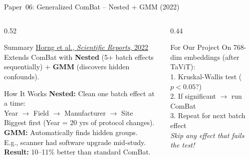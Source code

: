 \documentclass[aspectratio=169,xcolor=dvipsnames]{beamer}
\begin{document}
\begin{frame}{Paper~06: Generalized ComBat -- Nested + GMM (2022)}
    \begin{columns}
        \begin{column}{0.52\textwidth}
            \begin{block}{Summary}
                \small
                \href{https://doi.org/10.1038/s41598-022-08412-9}{Horng et al., \textit{Scientific Reports}, 2022}\\[0.3em]
                Extends ComBat with \textbf{Nested} (5+ batch effects sequentially) + \textbf{GMM} (discovers hidden confounds).
            \end{block}

            \vspace{0.2em}

            \begin{block}{How It Works}
                \scriptsize
                \textbf{Nested:} Clean one batch effect at a time:\\[0.1em]
                \quad Year $\to$ Field $\to$ Manufacturer $\to$ Site\\[0.1em]
                \quad Biggest first (Year = 20 yrs of protocol changes).\\[0.2em]
                \textbf{GMM:} Automatically finds hidden groups.\\[0.1em]
                \quad E.g., scanner had software upgrade mid-study.\\[0.2em]
                \textbf{Result:} 10--11\% better than standard ComBat.
            \end{block}
        \end{column}

        \begin{column}{0.44\textwidth}
            \begin{alertblock}{For Our Project}
                \scriptsize
                On 768-dim embeddings (after TaViT):\\[0.2em]
                1. Kruskal-Wallis test ($p<0.05$?)\\[0.1em]
                2. If significant $\to$ run ComBat\\[0.1em]
                3. Repeat for next batch effect\\[0.2em]
                \textit{Skip any effect that fails the test!}
            \end{alertblock}


\end{column}
\end{columns}
\end{frame}
\end{document}
